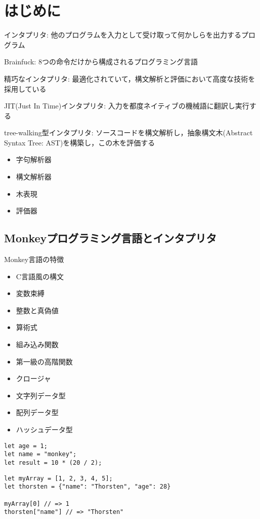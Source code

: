 \section{はじめに}

インタプリタ: 他のプログラムを入力として受け取って何かしらを出力するプログラム

Brainfuck: 8つの命令だけから構成されるプログラミング言語

精巧なインタプリタ: 最適化されていて，構文解析と評価において高度な技術を採用している

JIT(Just In Time)インタプリタ: 入力を都度ネイティブの機械語に翻訳し実行する

tree-walking型インタプリタ: ソースコードを構文解析し，抽象構文木(Abstract Syntax Tree: AST)を構築し，この木を評価する

\begin{itemize}
  \item 字句解析器
  \item 構文解析器
  \item 木表現
  \item 評価器
\end{itemize}

\subsection{Monkeyプログラミング言語とインタプリタ}

Monkey言語の特徴

\begin{itemize}
  \item C言語風の構文
  \item 変数束縛
  \item 整数と真偽値
  \item 算術式
  \item 組み込み関数
  \item 第一級の高階関数
  \item クロージャ
  \item 文字列データ型
  \item 配列データ型
  \item ハッシュデータ型
\end{itemize}

\begin{lstlisting}[caption=Monkeyで名前を値に束縛]
let age = 1;
let name = "monkey";
let result = 10 * (20 / 2);
\end{lstlisting}

\begin{lstlisting}[caption=整数の配列とハッシュに名前を束縛]
let myArray = [1, 2, 3, 4, 5];
let thorsten = {"name": "Thorsten", "age": 28}

myArray[0] // => 1
thorsten["name"] // => "Thorsten"
\end{lstlisting}

